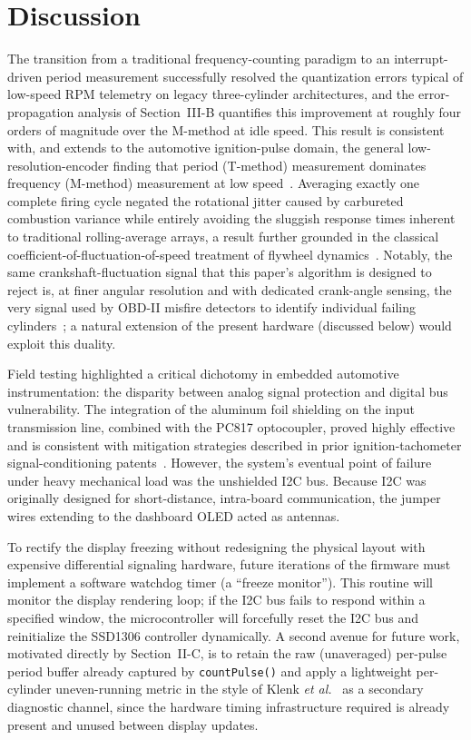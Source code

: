 \documentclass[journal, twocolumn]{IEEEtran}
\begin{document}
\section{Discussion}
The transition from a traditional frequency-counting paradigm to an interrupt-driven period measurement successfully resolved the quantization errors typical of low-speed RPM telemetry on legacy three-cylinder architectures, and the error-propagation analysis of Section~III-B quantifies this improvement at roughly four orders of magnitude over the M-method at idle speed. This result is consistent with, and extends to the automotive ignition-pulse domain, the general low-resolution-encoder finding that period (T-method) measurement dominates frequency (M-method) measurement at low speed~\cite{petrella2007,mtmethod2017}. Averaging exactly one complete firing cycle negated the rotational jitter caused by carbureted combustion variance while entirely avoiding the sluggish response times inherent to traditional rolling-average arrays, a result further grounded in the classical coefficient-of-fluctuation-of-speed treatment of flywheel dynamics~\cite{khurmi_tom}. Notably, the same crankshaft-fluctuation signal that this paper's algorithm is designed to reject is, at finer angular resolution and with dedicated crank-angle sensing, the very signal used by OBD-II misfire detectors to identify individual failing cylinders~\cite{rizzoni1989,klenk1993,misfire2011}; a natural extension of the present hardware (discussed below) would exploit this duality.

Field testing highlighted a critical dichotomy in embedded automotive instrumentation: the disparity between analog signal protection and digital bus vulnerability. The integration of the aluminum foil shielding on the input transmission line, combined with the PC817 optocoupler, proved highly effective and is consistent with mitigation strategies described in prior ignition-tachometer signal-conditioning patents~\cite{signalcond1990,twocycletach1988}. However, the system's eventual point of failure under heavy mechanical load was the unshielded I2C bus. Because I2C was originally designed for short-distance, intra-board communication, the jumper wires extending to the dashboard OLED acted as antennas.

To rectify the display freezing without redesigning the physical layout with expensive differential signaling hardware, future iterations of the firmware must implement a software watchdog timer (a ``freeze monitor''). This routine will monitor the display rendering loop; if the I2C bus fails to respond within a specified window, the microcontroller will forcefully reset the I2C bus and reinitialize the SSD1306 controller dynamically. A second avenue for future work, motivated directly by Section~II-C, is to retain the raw (unaveraged) per-pulse period buffer already captured by \texttt{countPulse()} and apply a lightweight per-cylinder uneven-running metric in the style of Klenk \emph{et al.}~\cite{klenk1993} as a secondary diagnostic channel, since the hardware timing infrastructure required is already present and unused between display updates.
\end{document}
